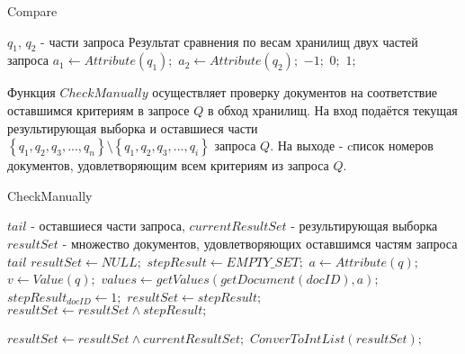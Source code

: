 \documentclass{matmex-diploma}
\begin{document}
        \begin{algorithm}[H]                   
        \caption{Compare}              
        \label{cmp}                        
            \begin{algorithmic}        
                \REQUIRE $q_1$, $q_2$ - части запроса
                \ENSURE Результат сравнения по весам хранилищ двух частей запроса
                \STATE $a_1 \leftarrow Attribute(q_1);$
                \STATE $a_2 \leftarrow Attribute(q_2);$
                    \RETURN $-1;$
                \ELSE 
                        \RETURN $0;$
                    \ELSE
                        \RETURN $1;$
                    \ENDIF
                \ENDIF
            \end{algorithmic}
        \end{algorithm}
        
        Функция $CheckManually$ осуществляет проверку документов на соответствие оставшимся критериям в запросе $Q$ в обход хранилищ. На вход подаётся текущая результирующая выборка и оставшиеся части $\left\{ q_1, q_2, q_3, ... , q_n \right\} \setminus \left\{ q_1, q_2, q_3, ... , q_i \right\}$ запроса $Q$. На выходе - cписок номеров документов, удовлетворяющим всем критериям из запроса $Q$.   
        
        \begin{algorithm}[H]                   
        \caption{CheckManually}              
        \label{check}                        
            \begin{algorithmic}        
                \REQUIRE $tail$ - оставшиеся части запроса, $currentResultSet$ - результирующая выборка
                \ENSURE $resultSet$ - множество документов, удовлетворяющих оставшимся частям запроса $tail$
                \STATE $resultSet \leftarrow NULL;$
                    \STATE $stepResult \leftarrow EMPTY\_SET;$
                        \STATE $a \leftarrow Attribute(q);$
                        \STATE $v \leftarrow Value(q);$
                        \STATE $values \leftarrow getValues(getDocument(docID), a);$
                                \STATE $stepResult_{docID} \leftarrow 1;$
                            \ENDIF
                        \ENDFOR
                    \ENDFOR
                        \STATE $resultSet \leftarrow stepResult;$
                    \ENDIF
                    \STATE $resultSet \leftarrow resultSet \land stepResult;$
                    
                \ENDFOR
                \STATE $resultSet \leftarrow resultSet \land currentResultSet;$
                \RETURN $ConverToIntList(resultSet);$
            \end{algorithmic}
        \end{algorithm}
        
\end{document}
